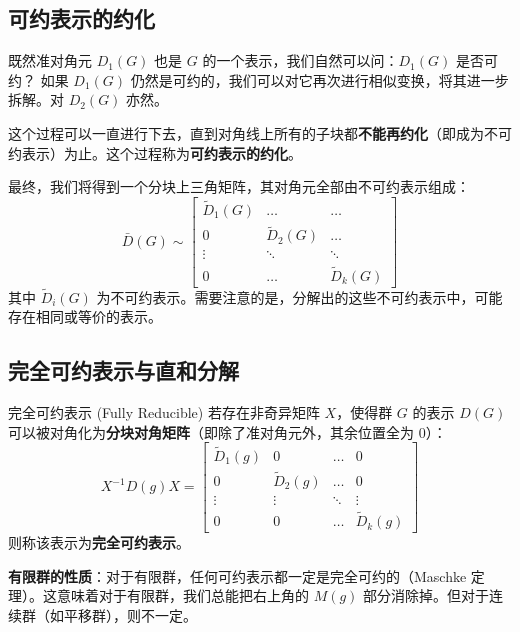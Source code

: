 \subsection{可约表示的约化}
既然准对角元 $D_1(G)$ 也是 $G$ 的一个表示，我们自然可以问：$D_1(G)$ 是否可约？
如果 $D_1(G)$ 仍然是可约的，我们可以对它再次进行相似变换，将其进一步拆解。对 $D_2(G)$ 亦然。

这个过程可以一直进行下去，直到对角线上所有的子块都\textbf{不能再约化}（即成为不可约表示）为止。这个过程称为\textbf{可约表示的约化}。

最终，我们将得到一个分块上三角矩阵，其对角元全部由不可约表示组成：
\begin{equation}
    \bar{D}(G) \sim \begin{bmatrix} 
        \tilde{D}_1(G) & \dots & \dots \\
         0 & \tilde{D}_2(G) & \dots \\
         \vdots & \ddots & \ddots \\
         0 & \dots & \tilde{D}_k(G)
    \end{bmatrix}
\end{equation}
其中 $\tilde{D}_i(G)$ 为不可约表示。需要注意的是，分解出的这些不可约表示中，可能存在相同或等价的表示。

\subsection{完全可约表示与直和分解}
\begin{definition}{完全可约表示 (Fully Reducible)}
    若存在非奇异矩阵 $X$，使得群 $G$ 的表示 $D(G)$ 可以被对角化为\textbf{分块对角矩阵}（即除了准对角元外，其余位置全为 $0$）：
    \begin{equation}
        X^{-1}D(g)X = \begin{bmatrix} 
            \tilde{D}_1(g) & 0 & \dots & 0 \\
            0 & \tilde{D}_2(g) & \dots & 0 \\
            \vdots & \vdots & \ddots & \vdots \\
            0 & 0 & \dots & \tilde{D}_k(g)
        \end{bmatrix}
    \end{equation}
    则称该表示为\textbf{完全可约表示}。
\end{definition}

\begin{note}
    \textbf{有限群的性质}：对于有限群，任何可约表示都一定是完全可约的（Maschke 定理）。这意味着对于有限群，我们总能把右上角的 $M(g)$ 部分消除掉。但对于连续群（如平移群），则不一定。
\end{note}

